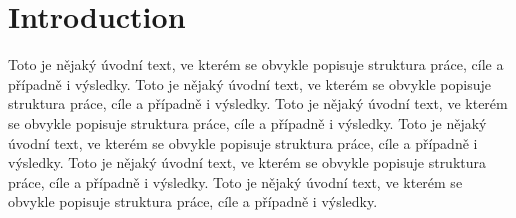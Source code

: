 \chapter*{Introduction}

Toto je nějaký úvodní text, ve kterém se obvykle popisuje struktura práce, cíle a případně i výsledky. Toto je nějaký
úvodní text, ve kterém se obvykle popisuje struktura práce, cíle a případně i výsledky. Toto je nějaký
úvodní text, ve kterém se obvykle popisuje struktura práce, cíle a případně i výsledky. Toto je nějaký
úvodní text, ve kterém se obvykle popisuje struktura práce, cíle a případně i výsledky. Toto je nějaký
úvodní text, ve kterém se obvykle popisuje struktura práce, cíle a případně i výsledky. Toto je nějaký
úvodní text, ve kterém se obvykle popisuje struktura práce, cíle a případně i výsledky. 

